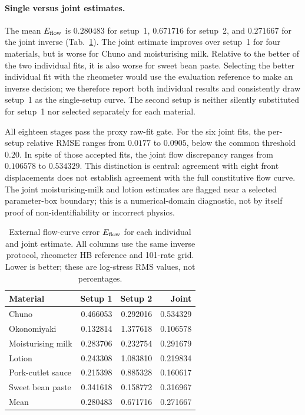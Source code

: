 \paragraph{Single versus joint estimates.}
The mean $E_{\rm flow}$ is $0.280483$ for setup~1, $0.671716$ for
setup~2, and $0.271667$ for the joint inverse
(Tab.~\ref{tab:real-flow-stage-comparison}). The joint estimate improves
over setup~1 for four materials, but is worse for Chuno and moisturising
milk. Relative to the better of the two individual fits, it is also
worse for sweet bean paste. Selecting the better individual fit with
the rheometer would use the evaluation reference to make an inverse
decision; we therefore report both individual results and consistently
draw setup~1 as the single-setup curve. The second setup is neither
silently substituted for setup~1 nor selected separately for each material.

All eighteen stages pass the proxy raw-fit gate. For the six joint fits,
the per-setup relative RMSE ranges from $0.0177$ to $0.0905$, below
the common threshold $0.20$. In spite of those accepted fits, the
joint flow discrepancy ranges from $0.106578$ to $0.534329$.
This distinction is central: agreement with eight front displacements
does not establish agreement with the full constitutive flow curve.
The joint moisturising-milk and lotion estimates are flagged near a
selected parameter-box boundary; this is a numerical-domain diagnostic,
not by itself proof of non-identifiability or incorrect physics.

\begin{table}[!htbp]
\centering\footnotesize
\setlength{\tabcolsep}{4pt}
\caption{External flow-curve error $E_{\rm flow}$ for each individual and joint estimate. All columns use the same inverse protocol, rheometer HB reference and 101-rate grid. Lower is better; these are log-stress RMS values, not percentages.}
\label{tab:real-flow-stage-comparison}
\begin{tabular}{@{}lrrr@{}}
\toprule
Material & Setup 1 & Setup 2 & Joint \\
\midrule
Chuno & 0.466053 & 0.292016 & 0.534329 \\
Okonomiyaki & 0.132814 & 1.377618 & 0.106578 \\
Moisturising milk & 0.283706 & 0.232754 & 0.291679 \\
Lotion & 0.243308 & 1.083810 & 0.219834 \\
Pork-cutlet sauce & 0.215398 & 0.885328 & 0.160617 \\
Sweet bean paste & 0.341618 & 0.158772 & 0.316967 \\
\midrule
Mean & 0.280483 & 0.671716 & 0.271667 \\
\bottomrule
\end{tabular}
\end{table}




